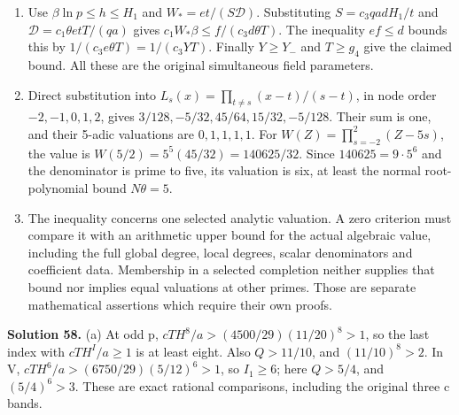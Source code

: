 \documentclass[
  11pt,
  a4paper,
]{article}
\begin{document}
\begin{enumerate}
\def\labelenumi{(\alph{enumi})}
\setcounter{enumi}{1}
\item
  Use \(\beta\ln p\le h\le H_1\) and \(W_*=et/(S\mathcal D)\).
  Substituting \(S=c_3qa dH_1/t\) and \(\mathcal D=c_1\theta etT/(qa)\)
  gives \(c_1W_*\beta\le f/(c_3d\theta T)\). The inequality \(ef\le d\)
  bounds this by \(1/(c_3e\theta T)=1/(c_3YT)\). Finally \(Y\ge Y_-\)
  and \(T\ge g_4\) give the claimed bound. All these are the original
  simultaneous field parameters.
\item
  Direct substitution into \(L_s(x)=\prod_{t\ne s}(x-t)/(s-t)\), in node
  order \(-2,-1,0,1,2\), gives \(3/128,-5/32,45/64,15/32,-5/128\). Their
  sum is one, and their 5-adic valuations are \(0,1,1,1,1\). For
  \(W(Z)=\prod_{s=-2}^2(Z-5s)\), the value is
  \(W(5/2)=5^5(45/32)=140625/32\). Since \(140625=9\cdot5^6\) and the
  denominator is prime to five, its valuation is six, at least the
  normal root-polynomial bound \(N\theta=5\).
\item
  The inequality concerns one selected analytic valuation. A zero
  criterion must compare it with an arithmetic upper bound for the
  actual algebraic value, including the full global degree, local
  degrees, scalar denominators and coefficient data. Membership in a
  selected completion neither supplies that bound nor implies equal
  valuations at other primes. Those are separate mathematical assertions
  which require their own proofs.
\end{enumerate}

\textbf{Solution 58.} (a) At odd p, \(cTH^8/a>(4500/29)(11/20)^8>1\), so
the last index with \(cTH^I/a\ge1\) is at least eight. Also \(Q>11/10\),
and \((11/10)^8>2\). In V, \(cTH^6/a>(6750/29)(5/12)^6>1\), so
\(I_1\ge6\); here \(Q>5/4\), and \((5/4)^6>3\). These are exact rational
comparisons, including the original three c bands.
\end{document}
